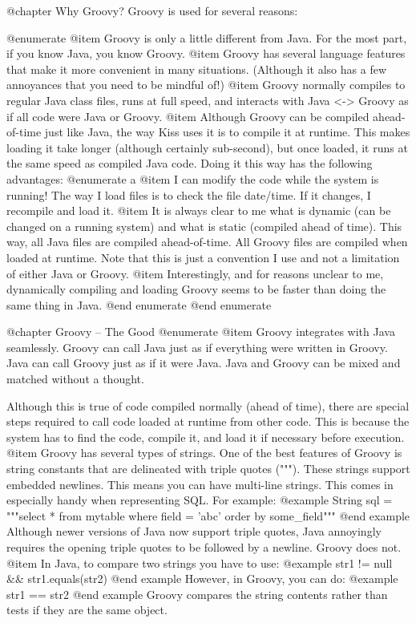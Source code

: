 @chapter Why Groovy?
Groovy is used for several reasons:

@enumerate
@item
Groovy is only a little different from Java.  For the most part, if
you know Java, you know Groovy.
@item
Groovy has several language features that make it
more convenient in many situations.  (Although it also has a few
annoyances that you need to be mindful of!)
@item
Groovy normally compiles to regular Java class files, runs at full
speed, and interacts with Java <-> Groovy as if all code were Java or
Groovy.
@item
Although Groovy can be compiled ahead-of-time just like Java, the
way Kiss uses it is to compile it at runtime.  This makes loading
it take longer (although certainly sub-second), but once loaded, it
runs at the same speed as compiled Java code.  Doing it this way
has the following advantages:
@enumerate a
@item
I can modify the code while the system is running!  The way I
load files is to check the file date/time.  If it changes, I
recompile and load it.
@item
It is always clear to me what is dynamic (can be changed on a
running system) and what is static (compiled ahead of time).
This way, all Java files are compiled ahead-of-time.  All Groovy files
are compiled when loaded at runtime.  Note that this is just a
convention I use and not a limitation of either Java or Groovy.
@item
Interestingly, and for reasons unclear to me, dynamically
compiling and loading Groovy seems to be
faster than doing the same thing in Java.
@end enumerate
@end enumerate

@chapter Groovy -- The Good
@enumerate
@item
Groovy integrates with Java seamlessly.  Groovy can call Java just
as if everything were written in Groovy.  Java can call Groovy just
as if it were Java.  Java and Groovy can be mixed and matched
without a thought.
   
Although this is true of code compiled normally (ahead of time),
there are special steps required to call code loaded at runtime
from other code.  This is because the system has to find the code,
compile it, and load it if necessary before execution.
@item
Groovy has several types of strings.  One of the best features of
Groovy is string constants that are delineated with triple quotes
(""").  These strings support embedded newlines.  This means you
can have multi-line strings.  This comes in especially handy when
representing SQL.  For example:
@example
       String sql = """select *
                       from mytable
                       where field = 'abc'
                       order by some_field"""
@end example
Although newer versions of Java now support triple quotes, Java
annoyingly requires the opening triple quotes to be followed by a
newline.  Groovy does not.
@item
In Java, to compare two strings you have to use:
@example
      str1 != null && str1.equals(str2)
@end example
   However, in Groovy, you can do:
@example
      str1 == str2
@end example
Groovy compares the string contents rather than tests if they are the same object.

